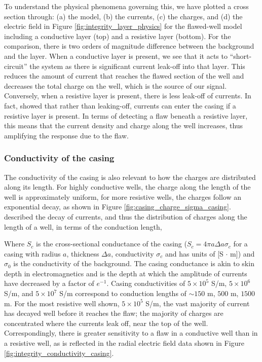 To understand the physical phenomena governing this, we have plotted a cross section through: (a) the model, (b) the currents, (c) the charges, and (d) the electric field in Figure \ref{fig:integrity_layer_physics} for the flawed-well model including a conductive layer (top) and a resistive layer (bottom). For the comparison, there is two orders of magnitude difference between the background and the layer. When a conductive layer is present, we see that it acts to ``short-circuit'' the system as there is significant current leak-off into that layer. This reduces the amount of current that reaches the flawed section of the well and decreases the total charge on the well, which is the source of our signal. Conversely, when a resistive layer is present, there is less leak-off of currents. In fact, \cite{Yang2016} showed that rather than leaking-off, currents can enter the casing if a resistive layer is present. In terms of detecting a flaw beneath a resistive layer, this means that the current density and charge along the well increases, thus amplifying the response due to the flaw.




\subsubsection{Conductivity of the casing}
The conductivity of the casing is also relevant to how the charges are distributed along its length. For highly conductive wells, the charge along the length of the well is approximately uniform, for more resistive wells, the charges follow an exponential decay, as shown in Figure \ref{fig:casing_charge_sigma_casing}. \cite{Schenkel1991} described the decay of currents, and thus the distribution of charges along the length of a well, in terms of the conduction length,


Where $S_c$ is the cross-sectional conductance of the casing ($S_c = 4\pi a \Delta a \sigma_c$ for a casing with radius $a$, thickness $\Delta a$, conductivity $\sigma_c$ and has units of [S $\cdot$ m]) and $\sigma_0$ is the conductivity of the background. The casing conductance is akin to skin depth in electromagnetics and is the depth at which  the amplitude of currents have decreased by a factor of $e^{-1}$. Casing conductivities of $5 \times 10^5$ S/m, $5 \times 10^6$ S/m, and $5 \times 10^7$ S/m correspond to conduction lengths of $\sim 150$ m, $500$ m, $1500$ m. For the most resistive well shown, $5 \times 10^{5}$ S/m, the vast majority of current has decayed well before it reaches the flaw; the majority of charges are concentrated where the currents leak off, near the top of the well. Correspondingly, there is greater sensitivity to a flaw in a conductive well than in a resistive well, as is reflected in the radial electric field data shown in Figure \ref{fig:integrity_conductivity_casing}.


